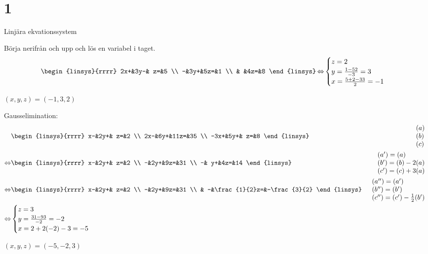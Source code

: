 \chapter{1}{Linjära ekvationssystem}
\begin{task}{1.1}
	Börja nerifrån och upp och lös en variabel i taget.
	\begin{align*}
		\begin{linsys}{rrrr}
			2x+&3y-& z=&5 \\ 
			  -&3y+&5z=&1 \\
			   &   &4z=&8
		\end{linsys} \lra
		\begin{cases}
			z=2 \\
			y=\frac{1-5\*2}{-3}=3 \\
			x=\frac{5+2-3\*3}{2}=-1
		\end{cases}
	\end{align*}
	
	\ans $(x,y,z)=(-1,3,2)$
\end{task}

\begin{task}{1.2}
	Gausselimination:
	\begin{align*}
		&\begin{linsys}{rrrr}
			  x-&2y+&  z=&2 \\
			 2x-&6y+&11z=&35 \\
			-3x+&5y+&  z=&8
		\end{linsys}
		&\begin{array}{l} 
			(a) \\ 
			(b) \\
			(c)
		\end{array} \\ \lra
		&\begin{linsys}{rrrr}
			x-&2y+& z=&2 \\
			 -&2y+&9z=&31 \\
			 -& y+&4z=&14
		\end{linsys} 
		&\begin{array}{l} 
			(a')=(a) \\ 
			(b')=(b)-2(a) \\
			(c')=(c)+3(a)
		\end{array} \\ \lra
		&\begin{linsys}{rrrr}
			x-&2y+& z=&2 \\
			 -&2y+&9z=&31 \\
			  &  -&\frac{1}{2}z=&-\frac{3}{2}
		\end{linsys}
		&\begin{array}{l} 
			(a'')=(a') \\ 
			(b'')=(b') \\
			(c'')=(c')-\frac{1}{2}(b')
		\end{array} \\ \lra
		&\begin{cases}
			z=3 \\
			y=\frac{31-9\*3}{-2} =-2\\
			x=2+2\*(-2)-3=-5
		\end{cases}
	\end{align*}
		
	\ans $(x,y,z)=(-5,-2,3)$
\end{task}

